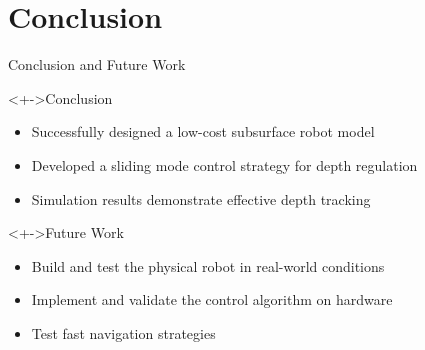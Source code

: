\documentclass[9pt, xcolor={usenames, dvipsnames}]{beamer}
\begin{document}
    \section{Conclusion}

        \begin{frame}{Conclusion and Future Work}
            \begin{block}<+->{Conclusion}
                \begin{itemize}
                    \item Successfully designed a low-cost subsurface robot model
                    \item Developed a sliding mode control strategy for depth regulation
                    \item Simulation results demonstrate effective depth tracking
                \end{itemize}
            \end{block}
            \begin{block}<+->{Future Work}
                \begin{itemize}
                    \item Build and test the physical robot in real-world conditions
                    \item Implement and validate the control algorithm on hardware
                    \item Test fast navigation strategies
                \end{itemize}
            \end{block}
        \end{frame}

    \maketitle

\end{document}
